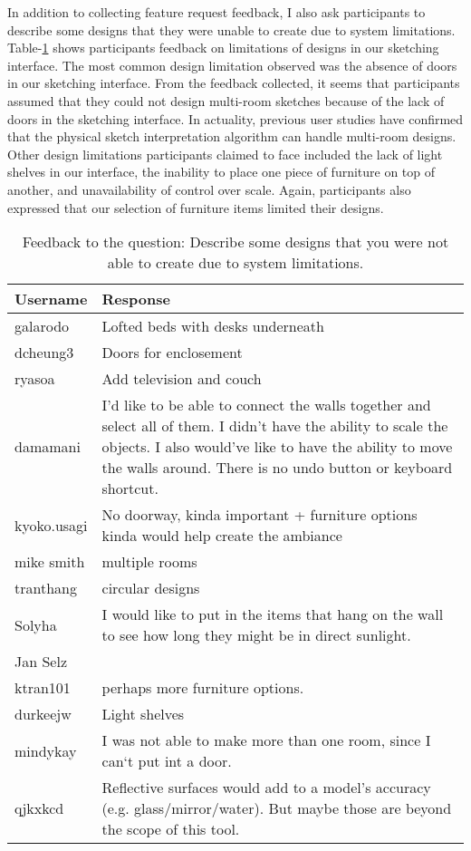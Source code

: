 In addition to collecting feature request feedback, I also ask participants to describe some designs that they were unable to create due to system limitations.
Table-\ref{fig:limitation} shows participants feedback on limitations of designs in our sketching interface.
The most common design limitation observed was the absence of doors in our sketching interface.
From the feedback collected, it seems that participants assumed that they could not design multi-room sketches because of the lack of doors in the sketching interface.
In actuality, previous user studies have confirmed that the physical sketch interpretation algorithm can handle multi-room designs.
Other design limitations participants claimed to face included the lack of light shelves in our interface, the inability to place one piece of furniture on top of another, and unavailability of control over scale.
Again, participants also expressed that our selection of furniture items limited their designs. \\

\begin{table}[!ht]
\centering
\caption[Describe some designs that you were not able to create due  to system limitations.]{Feedback to the question: Describe some designs that you were not able to create due  to system limitations. }
\label{fig:limitation}
\begin{tabular}{|p{}|p{}|}
\hline
\rowcolor[HTML]{EFEFEF} 
\textbf{Username} & \textbf{Response} \\ \hline
galarodo & Lofted beds with desks underneath \\ \hline
dcheung3 & Doors for enclosement \\ \hline
ryasoa & Add television and couch \\ \hline
damamani & I'd like to be able to connect the walls together and select all of them. I didn't have the ability to scale the objects.  I also would've like to have the ability to move the walls around. There is no undo button or keyboard shortcut. \\ \hline
kyoko.usagi & No doorway, kinda important + furniture options kinda would help create the ambiance \\ \hline
mike smith & multiple rooms \\ \hline
tranthang & circular designs \\ \hline
Solyha & I would like to put in the items that hang on the wall to see how long they might be in direct sunlight. \\ \hline
Jan Selz &  \\ \hline
ktran101 & perhaps more furniture options. \\ \hline
durkeejw & Light shelves \\ \hline
mindykay & I was not able to make more than one room, since I can`t put int a door. \\ \hline
qjkxkcd & Reflective surfaces would add to a model's accuracy (e.g. glass/mirror/water). But maybe those are beyond the scope of this tool. \\ \hline
\end{tabular}
\end{table}





